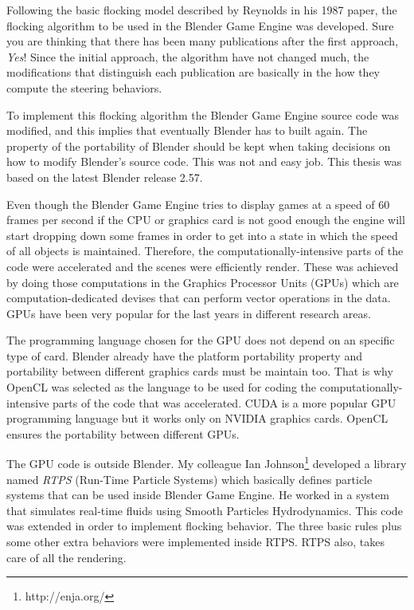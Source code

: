 Following the basic flocking model described by Reynolds in his 1987 paper, the flocking algorithm to be used in the Blender Game Engine was developed. Sure you are thinking that there has been many publications after the first approach, \textit{Yes}!  Since the initial approach, the algorithm have not changed much, the modifications that distinguish each publication are basically in the how they compute the steering behaviors.

To implement this flocking algorithm the Blender Game Engine source code was modified, and this implies that eventually Blender has to built again. The property of the portability of Blender should be kept when taking decisions on how to modify Blender's source code. This was not and easy job. This thesis was based on the latest Blender release 2.57. 


Even though the Blender Game Engine tries to display games at a speed of 60 frames per second\cite{bookGameKit2} if the CPU or graphics card is not good enough the engine will start dropping down some frames in order to get into a state in which the speed of all objects is maintained. Therefore, the computationally-intensive parts of the code were accelerated and the scenes were efficiently render. These was achieved by doing those computations in the Graphics Processor Units (GPUs) which are computation-dedicated devises that can perform vector operations in the data. GPUs have been very popular for the last years in different research areas. 

The programming language chosen for the GPU does not depend on an specific type of card. Blender already have the platform portability property and portability between different graphics cards must be maintain too. That is why OpenCL was selected as the language to be used for coding the computationally-intensive parts of the code that was accelerated. CUDA is a more popular GPU programming language but it works only on NVIDIA graphics cards. OpenCL ensures the portability between different GPUs.


The GPU code is outside Blender. My colleague Ian Johnson\footnote{http://enja.org/} developed a library named \textit{RTPS} (Run-Time Particle Systems) which basically defines particle systems that can be used inside Blender Game Engine. He worked in a system that simulates real-time fluids using Smooth Particles Hydrodynamics. This code was extended in order to implement flocking behavior. The three basic rules plus some other extra behaviors were implemented inside RTPS. RTPS also, takes care of all the rendering.

